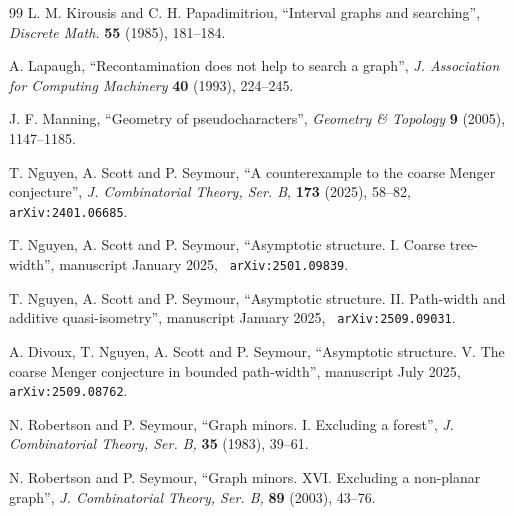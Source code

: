 \documentclass[titlepage,11pt]{article}
\begin{document}
\begin{thebibliography}{99}
		 L. M. Kirousis and C. H. Papadimitriou, ``Interval graphs and searching'', {\em Discrete Math.} {\bf 55} (1985),
		181--184.
		
		 A. Lapaugh, ``Recontamination does not help to search a graph'', {\em J. Association for Computing Machinery} {\bf 40} (1993),
		224--245.
		
		 J. F. Manning, ``Geometry of pseudocharacters'', {\em Geometry \& Topology} {\bf 9} (2005), 1147--1185.
		
		 T. Nguyen, A. Scott and P. Seymour, ``A counterexample to the coarse Menger conjecture'',
		{\em J. Combinatorial Theory, Ser. B},  {\bf 173}
		(2025), 58--82, {\tt arXiv:2401.06685}.
		
		
		 T. Nguyen, A. Scott and P. Seymour, ``Asymptotic structure. I. Coarse tree-width'', manuscript January 2025, {\tt
			arXiv:2501.09839}.
		
		 T. Nguyen, A. Scott and P. Seymour, ``Asymptotic structure. II. Path-width and additive quasi-isometry'', manuscript January 2025, {\tt
			arXiv:2509.09031}.
		
		
		
		
		 A. Divoux, T. Nguyen, A. Scott and P. Seymour, ``Asymptotic structure. V.
		The coarse Menger conjecture in bounded path-width'', manuscript July 2025, {\tt arXiv:2509.08762}.
		
		
		 N. Robertson and P. Seymour,  ``Graph minors. I. Excluding a forest'',
		{\em J. Combinatorial Theory, Ser. B,} {\bf 35} (1983), 39--61.
		
		
		 N. Robertson and P. Seymour,  ``Graph minors. XVI. Excluding a non-planar
		graph'',  {\em J. Combinatorial Theory, Ser. B,} {\bf 89} (2003), 43--76.
		
		
		
		
		
		
		
	\end{thebibliography}
\end{document}
